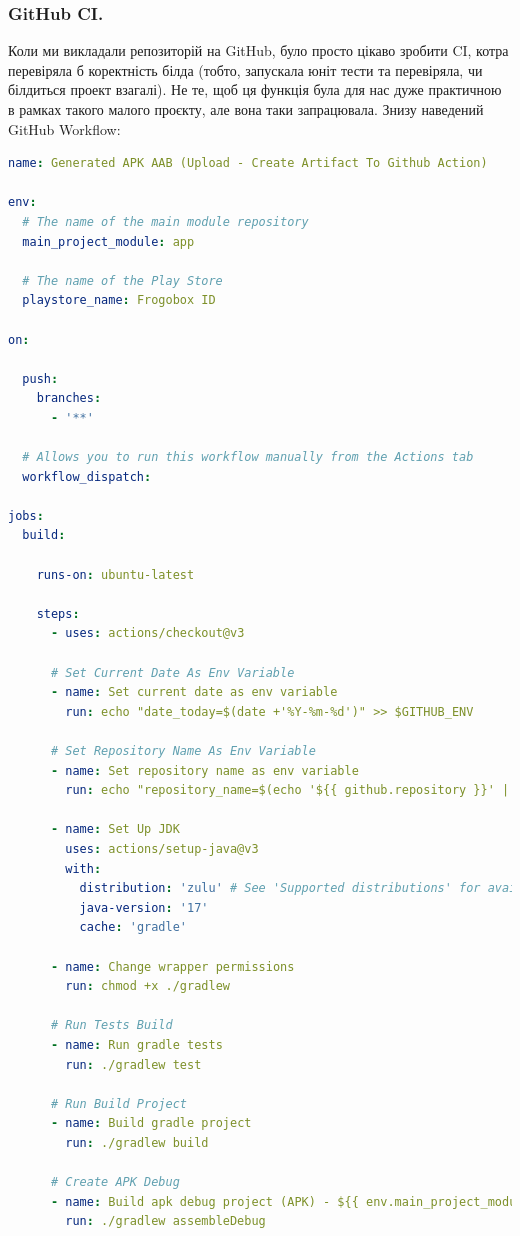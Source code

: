\documentclass[oneside,solution]{android-assign}
\begin{document}
\subsubsection{GitHub CI.} Коли ми викладали репозиторій на GitHub, було просто цікаво зробити CI, котра перевіряла б коректність білда (тобто, запускала юніт тести та перевіряла, чи білдиться проект взагалі). Не те, щоб ця функція була для нас дуже практичною в рамках такого малого проєкту, але вона таки запрацювала. Знизу наведений GitHub Workflow:

\begin{lstlisting}[language=yaml]
name: Generated APK AAB (Upload - Create Artifact To Github Action)

env:
  # The name of the main module repository
  main_project_module: app

  # The name of the Play Store
  playstore_name: Frogobox ID

on:

  push:
    branches:
      - '**'

  # Allows you to run this workflow manually from the Actions tab
  workflow_dispatch:

jobs:
  build:

    runs-on: ubuntu-latest

    steps:
      - uses: actions/checkout@v3

      # Set Current Date As Env Variable
      - name: Set current date as env variable
        run: echo "date_today=$(date +'%Y-%m-%d')" >> $GITHUB_ENV

      # Set Repository Name As Env Variable
      - name: Set repository name as env variable
        run: echo "repository_name=$(echo '${{ github.repository }}' | awk -F '/' '{print $2}')" >> $GITHUB_ENV

      - name: Set Up JDK
        uses: actions/setup-java@v3
        with:
          distribution: 'zulu' # See 'Supported distributions' for available options
          java-version: '17'
          cache: 'gradle'

      - name: Change wrapper permissions
        run: chmod +x ./gradlew

      # Run Tests Build
      - name: Run gradle tests
        run: ./gradlew test

      # Run Build Project
      - name: Build gradle project
        run: ./gradlew build

      # Create APK Debug
      - name: Build apk debug project (APK) - ${{ env.main_project_module }} module
        run: ./gradlew assembleDebug


\end{lstlisting}
\end{document}
